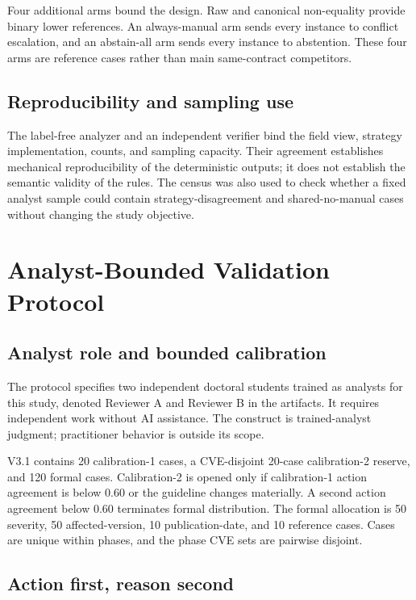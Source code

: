 \documentclass[preprint,review,12pt,authoryear]{elsarticle}
\begin{document}
Four additional arms bound the design. Raw and canonical non-equality provide
binary lower references. An always-manual arm sends every instance to conflict
escalation, and an abstain-all arm sends every instance to abstention. These
four arms are reference cases rather than main same-contract competitors.

\subsection{Reproducibility and sampling use}

The label-free analyzer and an independent verifier bind the field view,
strategy implementation, counts, and sampling capacity. Their agreement
establishes mechanical reproducibility of the deterministic outputs; it does not
establish the semantic validity of the rules. The census was also used to check
whether a fixed analyst sample could contain strategy-disagreement and
shared-no-manual cases without changing the study objective.

\section{Analyst-Bounded Validation Protocol}
\label{sec:protocol}

\subsection{Analyst role and bounded calibration}

The protocol specifies two independent doctoral students trained as analysts
for this study, denoted Reviewer A and Reviewer B in the artifacts. It requires
independent work without AI assistance. The construct is trained-analyst
judgment; practitioner behavior is outside its scope.

V3.1 contains 20 calibration-1 cases, a CVE-disjoint 20-case calibration-2
reserve, and 120 formal cases. Calibration-2 is opened only if calibration-1
action agreement is below 0.60 or the guideline changes materially. A second
action agreement below 0.60 terminates formal distribution. The formal
allocation is 50 severity, 50 affected-version, 10 publication-date, and 10
reference cases. Cases are unique within phases, and the phase CVE sets are
pairwise disjoint.

\subsection{Action first, reason second}
\end{document}
